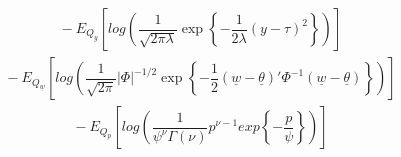 \documentclass[fleqn]{minimal}
\begin{document}
\begin{align*}
  \ \ \ \ \ \ \ \ \ \
  - E_{Q_{y}}
  \left[
    log \left(
      \dfrac{1}{\sqrt{2\pi\lambda}}
      \exp
      \left\{
        - \dfrac{1}{2\lambda}
        \left(y - \tau\right)^2
      \right\}
    \right)
  \right]
\end{align*}
\begin{align*}
  \ \ \ \ \ \ \ \ \ \
  - E_{Q_{\underline{w}}}
  \left[
    log \left(
      \dfrac{1}{\sqrt{2\pi}}
      \left| \Phi \right|^{-1/2}
      \exp
      \left\{
        - \dfrac{1}{2}
        \left( \underline{w} - \underline{\theta}\right)'
        \Phi^{-1}
        \left( \underline{w} - \underline{\theta}\right)
      \right\}
    \right)
  \right]
\end{align*}
\begin{align*}
  \ \ \ \ \ \ \ \ \ \
  - E_{Q_{p}}
  \left[
    log \left(
      \dfrac{1}{\psi^{\nu} \Gamma(\nu)}
      p^{\nu-1}
      exp
      \left\{
        - \dfrac{p}{\psi}
      \right\}
    \right)
  \right]
\end{align*}
\end{document}
